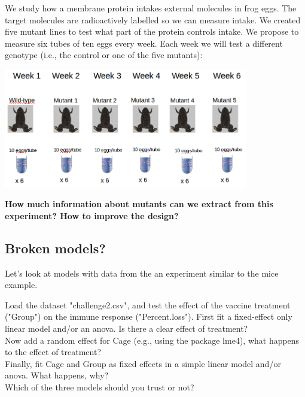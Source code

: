 \documentclass[12pt,a4paper]{scrartcl}\usepackage[]{graphicx}\usepackage[]{color}
\begin{document}
\begin{Exercise}[difficulty=1, title={A better experimental design}]
We study how a membrane protein intakes external molecules in frog eggs. The target molecules are radioactively labelled so we can measure intake. We created five mutant lines to test what part of the protein controls intake. We propose to measure six tubes of ten eggs every week. Each week we will test a different genotype (i.e., the control or one of the five mutants):

\includegraphics[width=0.8\textwidth]{Figures/expdes2}

\textbf{How much information about mutants can we extract from this experiment? How to improve the design?}

\end{Exercise}


\subsection{Broken models?}

Let's look at models with data from the an experiment similar to the mice example.
\begin{Exercise}[difficulty=1, title={lm vs. lmer vs. lm+}]

Load the dataset "challenge2.csv", and test the effect of the vaccine treatment ("Group") on the immune response ("Percent.loss"). 
First fit a fixed-effect only linear model and/or an anova. Is there a clear effect of treatment?\\
Now add a random effect for Cage (e.g., using the package lme4), what happens to the effect of treatment?\\
Finally, fit Cage and Group as fixed effects in a simple linear model and/or anova. What happens, why?\\
Which of the three models should you trust or not?

\end{Exercise}
\end{document}
